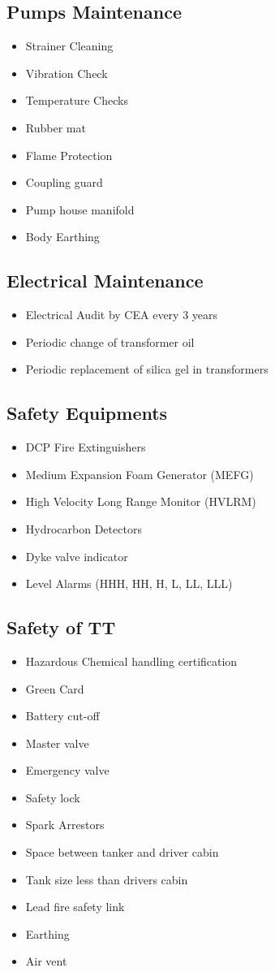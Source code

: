 \documentclass{report}
\begin{document}
	\subsection{Pumps Maintenance}
	\begin{itemize}
		\item Strainer Cleaning
		\item Vibration Check
		\item Temperature Checks
		\item Rubber mat
		\item Flame Protection
		\item Coupling guard
		\item Pump house manifold 
		\item Body Earthing
	\end{itemize}
	\subsection{Electrical Maintenance}
	\begin{itemize}
		\item Electrical Audit by CEA every 3 years
		\item Periodic change of transformer oil
		\item Periodic replacement of silica gel in transformers
	\end{itemize}
	\subsection{Safety Equipments}
	\begin{itemize}
		\item DCP Fire Extinguishers
		\item Medium Expansion Foam Generator (MEFG)
		\item High Velocity Long Range Monitor (HVLRM)
		\item Hydrocarbon Detectors
		\item Dyke valve indicator
		\item Level Alarms (HHH, HH, H, L, LL, LLL)
	\end{itemize}
	\subsection{Safety of TT}
	\begin{itemize}
		\item Hazardous Chemical handling certification
		\item Green Card
		\item Battery cut-off
		\item Master valve
		\item Emergency valve
		\item Safety lock
		\item Spark Arrestors
		\item Space between tanker and driver cabin
		\item Tank size less than drivers cabin
		\item Lead fire safety link
		\item Earthing
		\item Air vent
	\end{itemize}
\end{document}
